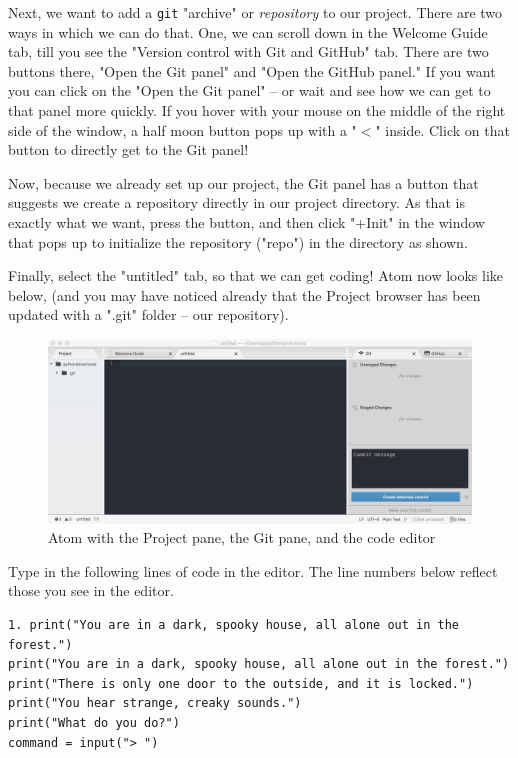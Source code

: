Next, we want to add a \texttt{git} "archive" or \emph{repository} to our project. There are two ways in which we can do that. One, we can scroll down in the Welcome Guide tab, till you see the "Version control with Git and GitHub" tab. There are two buttons there, "Open the Git panel" and "Open the GitHub panel." If you want you can click on the "Open the Git panel" -- or wait and see how we can get to that panel more quickly. If you hover with your mouse on the middle of the right side of the window, a half moon button pops up with a "$<$" inside. Click on that button to directly get to the Git panel! 

Now, because we already set up our project, the Git panel has a button that suggests we create a repository directly in our project directory. As that is exactly what we want, press the button, and then click "+Init" in the window that pops up to initialize the repository ("repo") in the directory as shown.  

Finally, select the "untitled" tab, so that we can get coding! Atom now looks like below, (and you may have noticed already that the Project browser has been updated with a ".git" folder -- our repository). 

\begin{figure}[h]
\centerline{\includegraphics[scale=.20]{images/p1ch1-gituntitledprojectbrowser.png}}
\caption{Atom with the Project pane, the Git pane, and the code editor}
\end{figure} 

Type in the following lines of code in the editor. The line numbers below reflect those you see in the editor. 

\pagebreak

\begin{lstlisting}
1. print("You are in a dark, spooky house, all alone out in the forest.")
print("You are in a dark, spooky house, all alone out in the forest.")
print("There is only one door to the outside, and it is locked.")
print("You hear strange, creaky sounds.")
print("What do you do?")
command = input("> ") 
\end{lstlisting}


